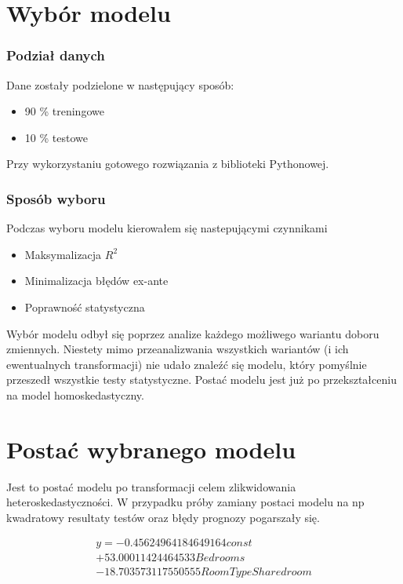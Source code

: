 \section{Wybór modelu}\label{sec:wybrany-modelu}

\subsubsection{Podział danych}

Dane zostały podzielone w następujący sposób:

\begin{itemize}
    \item 90 \% treningowe
    \item 10 \% testowe
\end{itemize}

Przy wykorzystaniu gotowego rozwiązania z biblioteki Pythonowej.

\subsubsection{Sposób wyboru}

Podczas wyboru modelu kierowałem się nastepującymi czynnikami

\begin{itemize}
    \item Maksymalizacja \(R^{2}\)
    \item Minimalizacja błędów ex-ante
    \item Poprawność statystyczna
\end{itemize}

Wybór modelu odbył się poprzez analize każdego możliwego wariantu doboru zmiennych.
Niestety mimo przeanalizwania wszystkich wariantów (i ich ewentualnych transformacji) nie udało znaleźć się modelu, który pomyślnie przeszedł wszystkie testy statystyczne.
Postać modelu jest już po przekształceniu na model homoskedastyczny.


\section{Postać wybranego modelu}\label{sec:postac-modelu}
Jest to postać modelu po transformacji celem zlikwidowania heteroskedastyczności.
W przypadku próby zamiany postaci modelu na np kwadratowy resultaty testów oraz błędy prognozy pogarszały się.

\begin{equation}
    \begin{split}
        y=-0.45624964184649164const \\ + 53.00011424464533Bedrooms \\ - 18.703573117550555RoomTypeShared room
    \end{split}
\end{equation}


